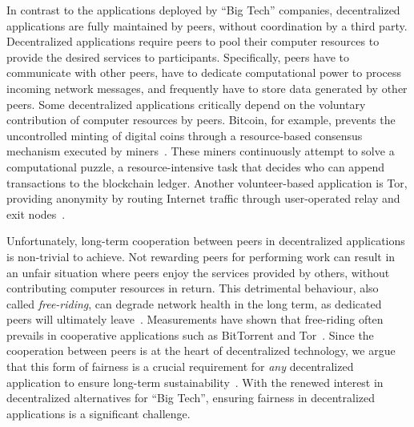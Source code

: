 In contrast to the applications deployed by \enquote{Big Tech} companies, decentralized applications are fully maintained by peers, without coordination by a third party.
Decentralized applications require peers to pool their computer resources to provide the desired services to participants.
Specifically, peers have to communicate with other peers, have to dedicate computational power to process incoming network messages, and frequently have to store data generated by other peers.
Some decentralized applications critically depend on the voluntary contribution of computer resources by peers.
Bitcoin, for example, prevents the uncontrolled minting of digital coins through a resource-based consensus mechanism executed by miners~\cite{nakamoto2008bitcoin}.
These miners continuously attempt to solve a computational puzzle, a resource-intensive task that decides who can append transactions to the blockchain ledger.
Another volunteer-based application is Tor, providing anonymity by routing Internet traffic through user-operated relay and exit nodes~\cite{dingledine2004tor}.

Unfortunately, long-term cooperation between peers in decentralized applications is non-trivial to achieve.
Not rewarding peers for performing work can result in an unfair situation where peers enjoy the services provided by others, without contributing computer resources in return.
This detrimental behaviour, also called \emph{free-riding}, can degrade network health in the long term, as dedicated peers will ultimately leave~\cite{locher2006free}.
Measurements have shown that free-riding often prevails in cooperative applications such as BitTorrent and Tor~\cite{sirivianos2007free}.
Since the cooperation between peers is at the heart of decentralized technology, we argue that this form of fairness is a crucial requirement for \emph{any} decentralized application to ensure long-term sustainability~\cite{jelasity2004detection}.
With the renewed interest in decentralized alternatives for \enquote{Big Tech}, ensuring fairness in decentralized applications is a significant challenge.

